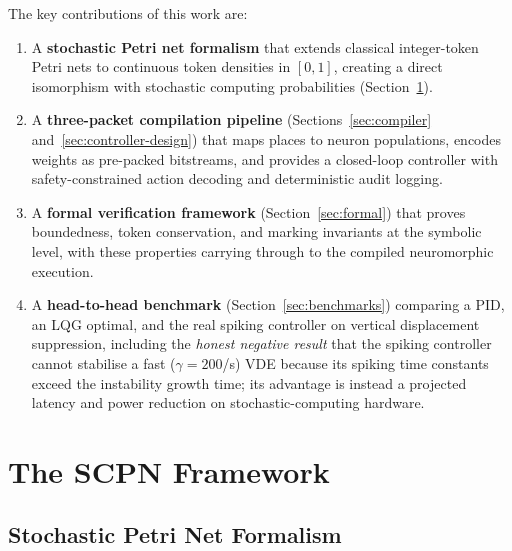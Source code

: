 \documentclass[12pt]{article}
\begin{document}
The key contributions of this work are:

\begin{enumerate}
  \item A \textbf{stochastic Petri net formalism} that extends classical
    integer-token Petri nets to continuous token densities in $[0,1]$,
    creating a direct isomorphism with stochastic computing probabilities
    (Section~\ref{sec:petri}).

  \item A \textbf{three-packet compilation pipeline} (Sections~\ref{sec:compiler}
    and~\ref{sec:controller-design}) that maps places to neuron populations,
    encodes weights as pre-packed bitstreams, and provides a closed-loop
    controller with safety-constrained action decoding and deterministic
    audit logging.

  \item A \textbf{formal verification framework}
    (Section~\ref{sec:formal}) that proves boundedness, token
    conservation, and marking invariants at the symbolic level, with
    these properties carrying through to the compiled neuromorphic
    execution.

  \item A \textbf{head-to-head benchmark} (Section~\ref{sec:benchmarks})
    comparing a PID, an LQG optimal, and the real spiking controller on
    vertical displacement suppression, including the \emph{honest negative
    result} that the spiking controller cannot stabilise a fast
    ($\gamma = 200$/s) VDE because its spiking time constants exceed the
    instability growth time; its advantage is instead a projected latency and
    power reduction on stochastic-computing hardware.
\end{enumerate}


\section{The SCPN Framework}
\label{sec:petri}

\subsection{Stochastic Petri Net Formalism}
\end{document}
